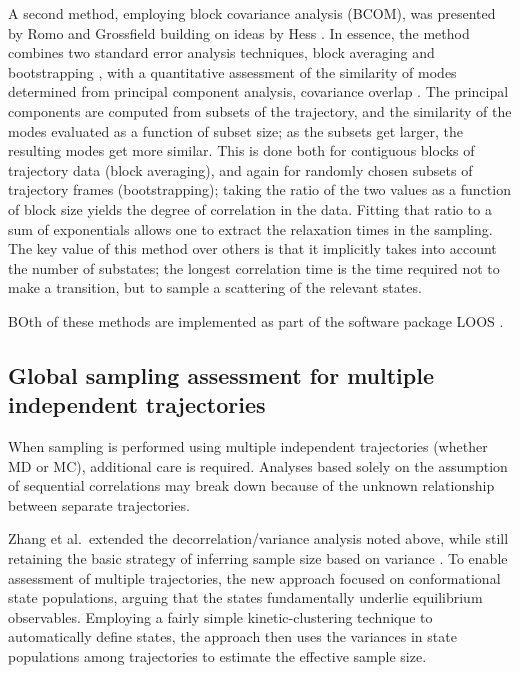 A second method, employing block covariance analysis (BCOM), was presented by Romo and Grossfield \cite{Romo2011} building on ideas by Hess \cite{Hess2002}.  In essence, the method combines two standard error analysis techniques, block averaging \cite{Flyvbjerg-1989} and bootstrapping \cite{Tibshirani1998}, with a quantitative assessment of the similarity of modes determined from principal component analysis, covariance overlap \cite{Hess2002}.  The principal components are computed from subsets of the trajectory, and the similarity of the modes evaluated as a function of subset size; as the subsets get larger, the resulting modes get more similar.  This is done both for contiguous blocks of trajectory data (block averaging), and again for randomly chosen subsets of trajectory frames (bootstrapping); taking the ratio of the two values as a function of block size yields the degree of correlation in the data.  Fitting that ratio to a sum of exponentials allows one to extract the relaxation times in the sampling.  The key value of this method over others is that it implicitly takes into account the number of substates; the longest correlation time is the time required not to make a transition, but to sample a scattering of the relevant states.

BOth of these methods are implemented as part of the software package LOOS \cite{LOOS,LOOS-JCC}.

\subsection{Global sampling assessment for multiple independent trajectories}
When sampling is performed using multiple independent trajectories (whether MD or MC), additional care is required.
Analyses based solely on the assumption of sequential correlations may break down because of the unknown relationship between separate trajectories.

Zhang et al.\ extended the decorrelation/variance analysis noted above, while still retaining the basic strategy of inferring sample size based on variance \cite{Zhang2010}.
To enable assessment of multiple trajectories, the new approach focused on conformational state populations, arguing that the states fundamentally underlie equilibrium observables.
Employing a fairly simple kinetic-clustering technique to automatically define states, the approach then uses the variances in state populations among trajectories to estimate the effective sample size.  %

